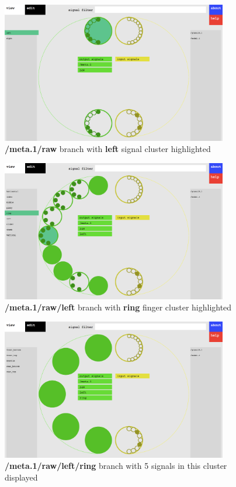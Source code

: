 \begin{figure}[p]
\centering
\includegraphics[width=0.88\textwidth]{vizmapperThird.png}
\caption{\textbf{/meta.1/raw} branch with \textbf{left} signal cluster highlighted}
\label{fig:vizThree}
\end{figure}

\begin{figure}[p]
\centering
\includegraphics[width=0.88\textwidth]{vizmapperFour.png}
\caption{\textbf{/meta.1/raw/left} branch with \textbf{ring} finger cluster highlighted}
\label{fig:vizFour}
\end{figure}

\begin{figure}[p]
\centering
\includegraphics[width=0.88\textwidth]{vizmapperFive.png}
\caption{\textbf{/meta.1/raw/left/ring} branch with 5 signals in this cluster displayed}
\label{fig:vizFive}
\end{figure}

